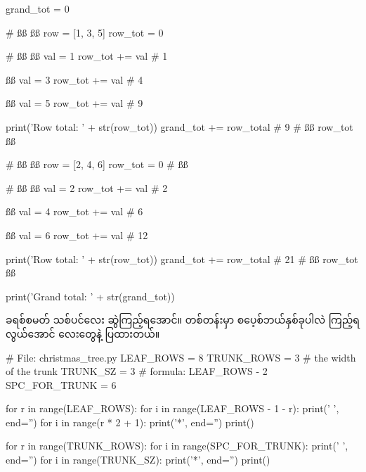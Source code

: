 %
\begin{py}
grand_tot = 0

    # ßß
    ßß
    row = [1, 3, 5]
    row_tot = 0

        # ßß
        ßß
        val = 1
        row_tot += val          # 1

        ßß
        val = 3
        row_tot += val          # 4

        ßß
        val = 5
        row_tot += val          # 9

    print('Row total: ' + str(row_tot))
    grand_tot += row_total  # 9
    # ßß row_tot ßß

    # ßß
    ßß
    row = [2, 4, 6]
    row_tot = 0 # ßß

        # ßß
        ßß
        val = 2
        row_tot += val          # 2

        ßß
        val = 4
        row_tot += val          # 6
        
        ßß
        val = 6
        row_tot += val          # 12

    print('Row total: ' + str(row_tot))
    grand_tot += row_total  # 21
    # ßß row_tot ßß

print('Grand total: ' + str(grand_tot))
\end{py}
%

ခရစ်စမတ် သစ်ပင်လေး ဆွဲကြည့်ရအောင်။ တစ်တန်းမှာ စပေ့စ်ဘယ်နှစ်ခုပါလဲ ကြည့်ရလွယ်အောင်  လေးတွေနဲ့ ပြထားတယ်။ 

%
\begin{py}
# File: christmas_tree.py
LEAF_ROWS = 8
TRUNK_ROWS = 3
# the width of the trunk
TRUNK_SZ = 3
# formula: LEAF_ROWS - 2
SPC_FOR_TRUNK = 6

for r in range(LEAF_ROWS):
    for i in range(LEAF_ROWS - 1 - r):
        print(' ', end='')
    for i in range(r * 2 + 1):
        print('*', end='')
    print()

for r in range(TRUNK_ROWS):
    for i in range(SPC_FOR_TRUNK):
        print(' ', end='')
    for i in range(TRUNK_SZ):
        print('*', end='')
    print()

\end{py}
%

